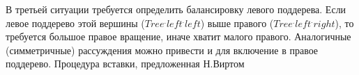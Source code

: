 \begin{frame}
    В третьей ситуации требуется определить балансировку левого поддерева.
    Если левое поддерево этой вершины ($Tree^.left^.left$) выше правого ($Tree^.left^.right$),
    то требуется большое правое вращение, иначе хватит малого правого.
    Аналогичные (симметричные) рассуждения можно привести и для включение в правое поддерево.
    Процедура вставки, предложенная Н.Виртом
\end{frame}